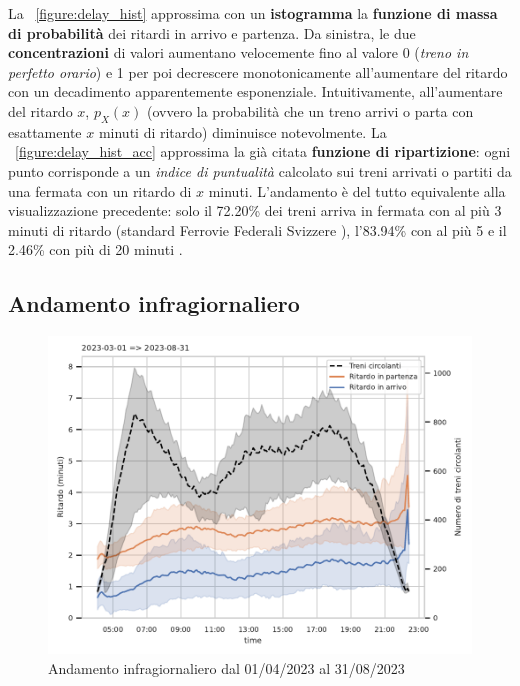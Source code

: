 \documentclass[12pt,italian]{report}
\begin{document}
La \figurename~\ref{figure:delay_hist} approssima con un
\textbf{istogramma} la \textbf{funzione di massa di probabilità} dei
ritardi in arrivo e partenza.  Da sinistra, le due
\textbf{concentrazioni} di valori aumentano velocemente fino al valore
0 (\textit{treno in perfetto orario}) e 1 per poi decrescere
monotonicamente all'aumentare del ritardo con un decadimento
apparentemente esponenziale.  Intuitivamente, all'aumentare del
ritardo $x$, $p_X(x)$ (ovvero la probabilità che un treno arrivi o
parta con esattamente $x$ minuti di ritardo) diminuisce notevolmente.
La \figurename~\ref{figure:delay_hist_acc} approssima la già citata
\textbf{funzione di ripartizione}: ogni punto corrisponde a un
\textit{indice di puntualità} calcolato sui treni arrivati o partiti
da una fermata con un ritardo di $x$ minuti.  L'andamento è del tutto
equivalente alla visualizzazione precedente: solo il 72.20\% dei treni
arriva in fermata con al più 3 minuti di ritardo (standard Ferrovie
Federali Svizzere \cite{SbbPuntualita}), l'83.94\% con al più 5 e il
2.46\% con più di 20 minuti \cite[G]{StatJup}.

\subsection{Andamento infragiornaliero}
\label{andamento_infragiornaliero}

\begin{figure}[h]
    \includegraphics[width=1\textwidth]{images/intraday_delay.pdf}
    \caption{Andamento infragiornaliero dal 01/04/2023 al
        31/08/2023~}
    \label{figure:intraday_delay}
\end{figure}
\end{document}
